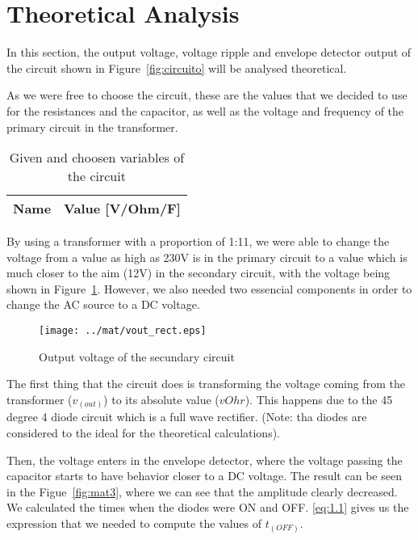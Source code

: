 \section{Theoretical Analysis}
\label{sec:analysis}

\hspace{0,5cm} In this section, the output voltage, voltage ripple and envelope detector output of the circuit shown in Figure~\ref{fig:circuito} will be analysed theoretical.

As we were free to choose the circuit, these are the values that we decided to use for the resistances and the capacitor, as well as the voltage and frequency of the primary circuit in the transformer.

\begin{table}[H]
  \centering
  \begin{tabular}{|l|r|}
    \hline    
    {\bf Name} & {\bf Value [V/Ohm/F]} \\ \hline
    
  \end{tabular}
  \caption{Given and choosen variables of the circuit}
  \label{tab:mat1}
\end{table}

By using a transformer with a proportion of 1:11, we were able to change the voltage from a value as high as 230V is in the primary circuit to a value which is much closer to the aim (12V) in the secondary circuit, with the voltage being shown in Figure~\ref{fig:mat2}. However, we also needed two essencial components in order to change the AC source to a DC voltage.

\begin{figure}[H] \centering
\texttt{[image: ../mat/vout\_rect.eps]}
\caption{Output voltage of the secundary circuit}
\label{fig:mat2}
\end{figure}

The first thing that the circuit does is transforming the voltage coming from the transformer ($v_(out)$) to its absolute value ($vOhr$). This happens due to the 45 degree 4 diode circuit which is a full wave rectifier. (Note: tha diodes are considered to the ideal for the theoretical calculations).

Then, the voltage enters in the envelope detector, where the voltage passing the capacitor starts to have behavior closer to a DC voltage. The result can be seen in the Figue~\ref{fig:mat3}, where we can see that the amplitude clearly decreased. We calculated the times when the diodes were ON and OFF. \ref{eq:1.1} gives us the expression that we needed to compute the values of $t_(OFF)$.

